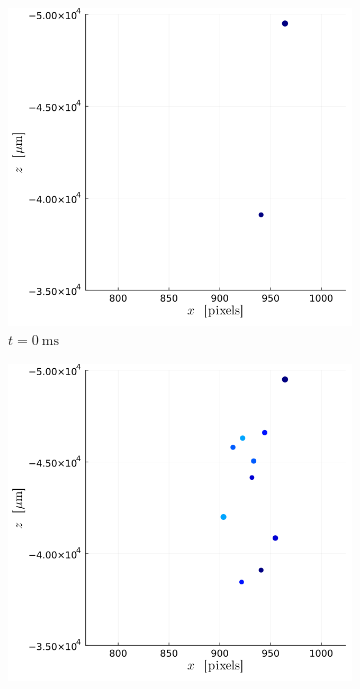 \begin{figure}[H]
    \centering
    \begin{subfigure}[t]{0.32\linewidth}
        \includegraphics[width=\linewidth]{./Figure/4_Results/exp/xz_detailed_view/out0001.png}
        \caption*{$t = \SI{0}{\ms}$}
    \end{subfigure}
    \begin{subfigure}[t]{0.32\linewidth}
        \includegraphics[width=\linewidth]{./Figure/4_Results/exp/xz_detailed_view/out0005.png}

\end{subfigure}
\end{figure}
